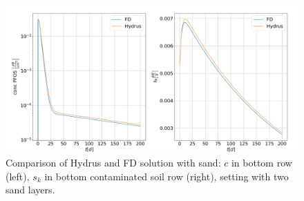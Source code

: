 \begin{figure}[h!]
\centering
	\includegraphics[width=\textwidth]{images/hyd_fd_last_cell_sand.png}
\caption[Comparison of Hydrus and FD BTC with sand]{Comparison of Hydrus and FD solution with sand: $c$ in bottom row (left), $s_k$ in bottom contaminated soil row (right), setting with two sand layers.}
\label{fig:hyd_fd_last_cell_sand}
\end{figure}
\FloatBarrier
